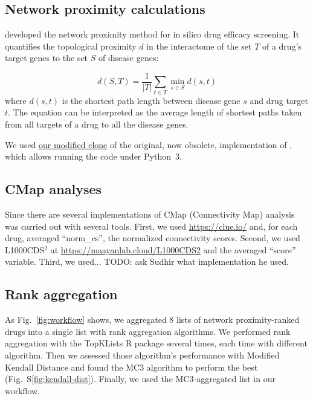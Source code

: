 \documentclass[letterpaper]{article}
\begin{document}
\subsection{Network proximity calculations}

\cite{Guney2016} developed the network proximity method for in silico drug efficacy screening.  It
quantifies the topological proximity $d$ in the interactome of the set $T$ of a drug's target genes
to the set $S$ of disease genes: 

\begin{equation}
  d(S, T) = \frac{1}{|T|}\sum_{t \in T} \min_{s \in S} d(s, t)
\end{equation}
where $d(s,t)$ is the shortest path length between disease gene $s$ and drug
target $t$.  The equation can be interpreted as the average length of shortest
paths taken from all targets of a drug to all the disease genes.

We used \href{https://github.com/attilagk/guney_code}{our modified clone} of
the original, now obsolete, implementation of \cite{Guney2016}, which allows
running the code under Python~3.

\subsection{CMap analyses}

Since there are several implementations of CMap (Connectivity Map) analysis was carried out with several tools.  First, we used
\url{https://clue.io/} \citep{Lamb2006} and, for each drug, averaged
``norm\_cs'',
the normalized connectivity scores.  Second, we used L1000CDS$^2$ at
\url{https://maayanlab.cloud/L1000CDS2} and the averaged ``score'' variable.
Third, we used... TODO: ask Sudhir what implementation he used.

\subsection{Rank aggregation}

As Fig.~\ref{fig:workflow} shows, we aggregated 8 lists of network
proximity-ranked drugs into a single list with rank aggregation algorithms.
We performed rank aggregation with the TopKLists R package
several times, each time with different algorithm.  Then we assessed those
algorithm's performance with Modified Kendall Distance and found the MC3
algorithm to perform the best (Fig.~S\ref{fig:kendall-dist}).  Finally, we
used the MC3-aggregated list in our workflow.
\end{document}
